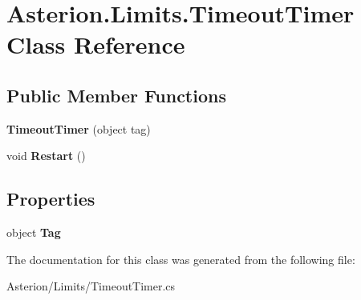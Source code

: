 \hypertarget{classAsterion_1_1Limits_1_1TimeoutTimer}{\section{Asterion.\-Limits.\-Timeout\-Timer Class Reference}
\label{classAsterion_1_1Limits_1_1TimeoutTimer}
}
\subsection*{Public Member Functions}
\begin{DoxyCompactItemize}
\item 
\hypertarget{classAsterion_1_1Limits_1_1TimeoutTimer_a69f1c8d2539df23e143acae98b9d7208}{{\bfseries Timeout\-Timer} (object tag)}\label{classAsterion_1_1Limits_1_1TimeoutTimer_a69f1c8d2539df23e143acae98b9d7208}

\item 
\hypertarget{classAsterion_1_1Limits_1_1TimeoutTimer_a08b319ffd75c172f4575325d833425c3}{void {\bfseries Restart} ()}\label{classAsterion_1_1Limits_1_1TimeoutTimer_a08b319ffd75c172f4575325d833425c3}

\end{DoxyCompactItemize}
\subsection*{Properties}
\begin{DoxyCompactItemize}
\item 
\hypertarget{classAsterion_1_1Limits_1_1TimeoutTimer_a9434eddc1291650403b3c75dc09fc0d8}{object {\bfseries Tag}}\label{classAsterion_1_1Limits_1_1TimeoutTimer_a9434eddc1291650403b3c75dc09fc0d8}

\end{DoxyCompactItemize}


The documentation for this class was generated from the following file\-:\begin{DoxyCompactItemize}
\item 
Asterion/\-Limits/Timeout\-Timer.\-cs\end{DoxyCompactItemize}
